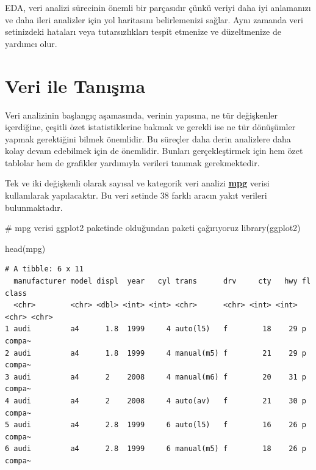 \documentclass[
  letterpaper,
  DIV=11,
  numbers=noendperiod]{scrreprt}
\newenvironment{Shaded}{\begin{snugshade}}{\end{snugshade}}
\newcommand{\CommentTok}[1]{\textcolor[rgb]{0.37,0.37,0.37}{#1}}
\newcommand{\FunctionTok}[1]{\textcolor[rgb]{0.28,0.35,0.67}{#1}}
\newcommand{\NormalTok}[1]{\textcolor[rgb]{0.00,0.23,0.31}{#1}}
\begin{document}
EDA, veri analizi sürecinin önemli bir parçasıdır çünkü veriyi daha iyi
anlamanızı ve daha ileri analizler için yol haritasını belirlemenizi
sağlar. Aynı zamanda veri setinizdeki hataları veya tutarsızlıkları
tespit etmenize ve düzeltmenize de yardımcı olur.

\hypertarget{veri-ile-tanux131ux15fma}{%
\section*{Veri ile Tanışma}\label{veri-ile-tanux131ux15fma}}


Veri analizinin başlangıç aşamasında, verinin yapısına, ne tür
değişkenler içerdiğine, çeşitli özet istatistiklerine bakmak ve gerekli
ise ne tür dönüşümler yapmak gerektiğini bilmek önemlidir. Bu süreçler
daha derin analizlere daha kolay devam edebilmek için de önemlidir.
Bunları gerçekleştirmek için hem özet tablolar hem de grafikler
yardımıyla verileri tanımak gerekmektedir.

Tek ve iki değişkenli olarak sayısal ve kategorik veri analizi
\href{https://ggplot2.tidyverse.org/reference/mpg.html}{\ul{\textbf{mpg}}}
verisi kullanılarak yapılacaktır. Bu veri setinde 38 farklı aracın yakıt
verileri bulunmaktadır.

\begin{Shaded}
\begin{Highlighting}[]
\CommentTok{\# mpg verisi ggplot2 paketinde olduğundan paketi çağırıyoruz}
\FunctionTok{library}\NormalTok{(ggplot2)}

\FunctionTok{head}\NormalTok{(mpg)}
\end{Highlighting}
\end{Shaded}

\begin{verbatim}
# A tibble: 6 x 11
  manufacturer model displ  year   cyl trans      drv     cty   hwy fl    class 
  <chr>        <chr> <dbl> <int> <int> <chr>      <chr> <int> <int> <chr> <chr> 
1 audi         a4      1.8  1999     4 auto(l5)   f        18    29 p     compa~
2 audi         a4      1.8  1999     4 manual(m5) f        21    29 p     compa~
3 audi         a4      2    2008     4 manual(m6) f        20    31 p     compa~
4 audi         a4      2    2008     4 auto(av)   f        21    30 p     compa~
5 audi         a4      2.8  1999     6 auto(l5)   f        16    26 p     compa~
6 audi         a4      2.8  1999     6 manual(m5) f        18    26 p     compa~
\end{verbatim}
\end{document}
